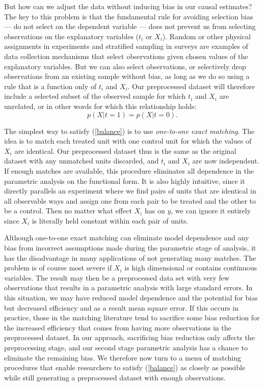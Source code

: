 \documentclass[11pt,titlepage]{article}
\begin{document}
But how can we adjust the data without inducing bias in our causal
estimates?  The key to this problem is that the fundamental rule for
avoiding selection bias --- do not select on the dependent variable
--- does not prevent us from selecting observations on the explanatory
variables ($t_i$ or $X_i$).  Random or other physical assignments in
experiments and stratified sampling in surveys are examples of data
collection mechanisms that select observations given chosen values of
the explanatory variables.  But we can also select observations, or
selectively drop observations from an existing sample without bias, as
long as we do so using a rule that is a function only of $t_i$ and
$X_i$.  Our preprocessed dataset will therefore include a selected
subset of the observed sample for which $t_i$ and $X_i$ are unrelated,
or in other words for which this relationship holds:
\begin{equation}
  \label{balance}
  p(X|t=1) = p(X|t=0).
\end{equation}

The simplest way to satisfy (\ref{balance}) is to use \emph{one-to-one
  exact matching}.  The idea is to match each treated unit with one
control unit for which the values of $X_i$ are identical.  Our
preprocessed dataset thus is the same as the original dataset with any
unmatched units discarded, and $t_i$ and $X_i$ are now independent.
If enough matches are available, this procedure eliminates all
dependence in the parametric analysis on the functional form.  It is
also highly intuitive, since it directly parallels an experiment where
we find pairs of units that are identical in all observable ways and
assign one from each pair to be treated and the other to be a control.
Then no matter what effect $X_i$ has on $y$, we can ignore it entirely
since $X_i$ is literally held constant within each pair of units.

Although one-to-one exact matching can eliminate model dependence and
any bias from incorrect assumptions made during the parametric stage
of analysis, it has the disadvantage in many applications of not
generating many matches.  The problem is of course most severe if
$X_i$ is high dimensional or contains continuous variables.  The
result may then be a preprocessed data set with very few observations
that results in a parametric analysis with large standard errors.  In
this situation, we may have reduced model dependence and the potential
for bias but decreased efficiency and as a result mean square error.
If this occurs in practice, those in the matching literature tend to
sacrifice some bias reduction for the increased efficiency that comes
from having more observations in the preprocessed dataset.  In our
approach, sacrificing bias reduction only affects the preprocessing
stage, and our second stage parametric analysis has a chance to
eliminate the remaining bias.  We therefore now turn to a menu of
matching procedures that enable researchers to satisfy (\ref{balance})
as closely as possible while still generating a preprocessed dataset
with enough observations.
\end{document}
